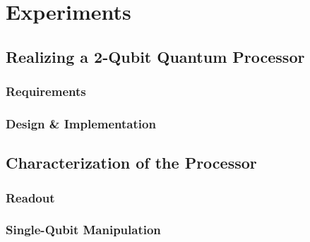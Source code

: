 \chapter{Experiments}


\section{Realizing a 2-Qubit Quantum Processor}


\subsection{Requirements}


\subsection{Design \& Implementation}


\section{Characterization of the Processor}


\subsection{Readout}


\subsection{Single-Qubit Manipulation}


